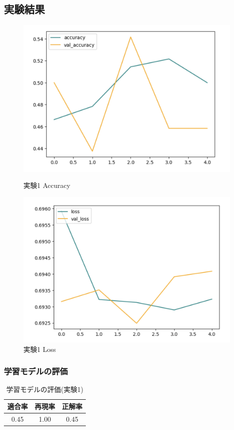 \documentclass[a4paper, 11pt, titlepage]{jsarticle}
\begin{document}
\subsection{実験結果}
\begin{figure}[htbp]
  \begin{minipage}[b]{0.45\linewidth}
    \centering
    \includegraphics[keepaspectratio, scale=0.32]{ex1_acc.png}
    \caption{実験1 Accuracy}
  \end{minipage}
  \begin{minipage}[b]{0.45\linewidth}
    \centering
    \includegraphics[keepaspectratio, scale=0.32]{ex1_loss.png}
    \caption{実験1 Loss}
  \end{minipage}
\end{figure}

\subsubsection{学習モデルの評価}
\begin{table}[htb]
\centering
  \caption{学習モデルの評価(実験1)}
  \begin{tabular}{|c|c|c|}  \hline
    適合率 & 再現率 & 正解率 \\ \hline
    0.45 & 1.00 & 0.45 \\ \hline
  \end{tabular}
\end{table}
\end{document}
